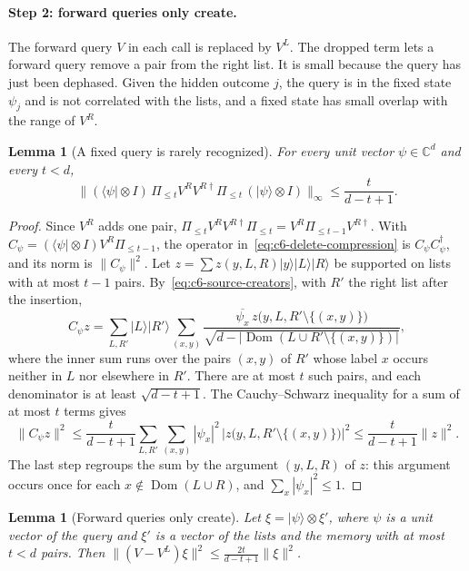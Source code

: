 \documentclass[11pt,letterpaper]{article}
\newtheorem{lemma}[theorem]{Lemma}
\theoremstyle{definition}\newtheorem{definition}[theorem]{Definition}
\newcommand{\C}{\mathbb C}
\newcommand{\Dom}{\operatorname{Dom}}
\newcommand{\ket}[1]{\lvert#1\rangle}
\newcommand{\bra}[1]{\langle#1\rvert}
\newcommand{\norm}[1]{\lVert#1\rVert}
\begin{document}
\paragraph{Step 2: forward queries only create.}
The forward query $V$ in each call is replaced by $V^L$. The dropped term
lets a forward
query remove a pair from the right list. It is small because the query
has just been dephased. Given the hidden outcome $j$, the query is in
the fixed state $\psi_j$ and is not correlated with the lists, and a
fixed state has small overlap with the range of $V^R$.

\begin{lemma}[A fixed query is rarely recognized]\label{appA:compression}
For every unit vector $\psi\in\C^d$ and every $t<d$,
\begin{equation}\label{eq:c6-delete-compression}
 \norm{(\bra\psi\otimes I)\,\Pi_{\le t}V^RV^{R\dagger}\Pi_{\le t}\,
       (\ket\psi\otimes I)}_\infty
 \le\frac{t}{d-t+1}.
\end{equation}
\end{lemma}

\begin{proof}
Since $V^R$ adds one pair,
$\Pi_{\le t}V^RV^{R\dagger}\Pi_{\le t}=V^R\Pi_{\le t-1}V^{R\dagger}$.
With $C_\psi=(\bra\psi\otimes I)V^R\Pi_{\le t-1}$, the operator
in~\eqref{eq:c6-delete-compression} is $C_\psi C_\psi^\dagger$, and its
norm is $\norm{C_\psi}^2$. Let $z=\sum z(y,L,R)\ket y\ket L\ket R$ be
supported on lists with at most $t-1$ pairs.
By~\eqref{eq:c6-source-creators}, with $R'$ the right list after the
insertion,
\[
 C_\psi z=\sum_{L,R'}\ket L\ket{R'}
 \sum_{(x,y)}\frac{\overline{\psi_x}\,z\bigl(y,L,R'\setminus\{(x,y)\}\bigr)}
 {\sqrt{d-|\Dom(L\cup R'\setminus\{(x,y)\})|}} ,
\]
where the inner sum runs over the pairs $(x,y)$ of $R'$ whose label
$x$ occurs neither in $L$ nor elsewhere in $R'$. There are at most
$t$ such pairs, and each denominator is at least $\sqrt{d-t+1}$. The
Cauchy--Schwarz inequality for a sum of at most $t$ terms gives
\[
 \norm{C_\psi z}^2\le\frac{t}{d-t+1}
 \sum_{L,R'}\sum_{(x,y)}|\psi_x|^2\,
 \bigl|z\bigl(y,L,R'\setminus\{(x,y)\}\bigr)\bigr|^2
 \le\frac{t}{d-t+1}\norm z^2 .
\]
The last step regroups the sum by the argument $(y,L,R)$ of $z$: this
argument occurs once for each $x\notin\Dom(L\cup R)$, and
$\sum_x|\psi_x|^2\le1$.
\end{proof}

\begin{lemma}[Forward queries only create]\label{appA:forward}
Let $\xi=\ket\psi\otimes\xi'$, where $\psi$ is a unit vector of the
query and $\xi'$ is a vector of the lists and the memory with at most
$t<d$ pairs. Then
$\norm{(V-V^L)\xi}^2\le\frac{2t}{d-t+1}\norm\xi^2$.
\end{lemma}
\end{document}
